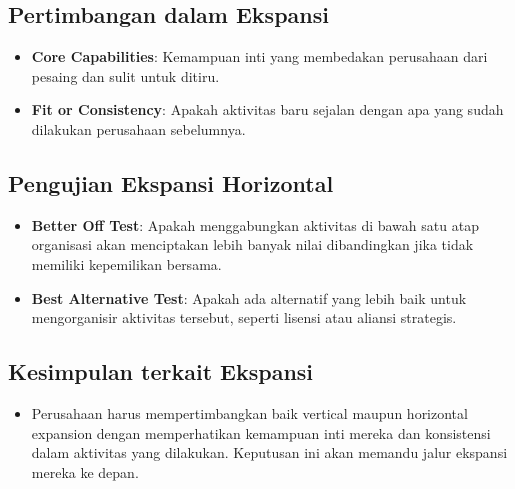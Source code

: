 \documentclass{article}
\begin{document}
\subsection{Pertimbangan dalam Ekspansi}
\begin{itemize}
    \item \textbf{Core Capabilities}: Kemampuan inti yang membedakan perusahaan dari pesaing dan sulit untuk ditiru.
    \item \textbf{Fit or Consistency}: Apakah aktivitas baru sejalan dengan apa yang sudah dilakukan perusahaan sebelumnya.
\end{itemize}

\subsection{Pengujian Ekspansi Horizontal}
\begin{itemize}
    \item \textbf{Better Off Test}: Apakah menggabungkan aktivitas di bawah satu atap organisasi akan menciptakan lebih banyak nilai dibandingkan jika tidak memiliki kepemilikan bersama.
    \item \textbf{Best Alternative Test}: Apakah ada alternatif yang lebih baik untuk mengorganisir aktivitas tersebut, seperti lisensi atau aliansi strategis.
\end{itemize}

\subsection{Kesimpulan terkait Ekspansi}
\begin{itemize}
    \item Perusahaan harus mempertimbangkan baik vertical maupun horizontal expansion dengan memperhatikan kemampuan inti mereka dan konsistensi dalam aktivitas yang dilakukan. Keputusan ini akan memandu jalur ekspansi mereka ke depan.
\end{itemize}

\end{document}
